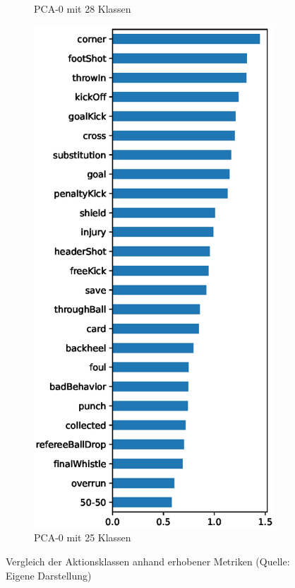 \begin{figure}
\begin{subfigure}{.24\textwidth}
        \caption{PCA-0 \newline mit 28 Klassen}
    \end{subfigure}
    \begin{subfigure}{.24\textwidth}
        \centering
        \includegraphics[width=0.99\textwidth, keepaspectratio, interpolate]{img/07_pca_by_class_socc_har_25.eps}
        \caption{PCA-0 \newline mit 25 Klassen}
        \label{fig:pca_by_class_phase_3}
    \end{subfigure}
    \caption[Vergleich der Aktionsklassen anhand erhobener Metriken]{Vergleich der Aktionsklassen anhand erhobener Metriken (Quelle: Eigene Darstellung)}
    \label{fig:class-metrics}
\end{figure}

